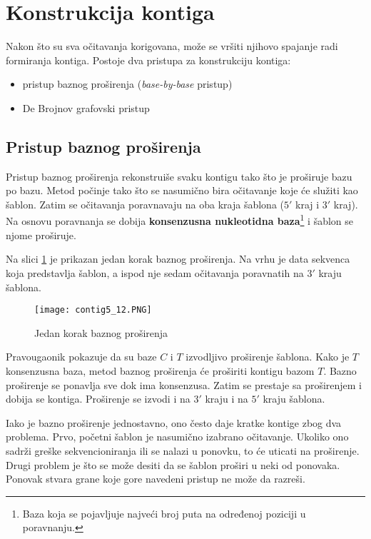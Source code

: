 \documentclass[12pt,oneside]{memoir}
\begin{document}
\section{Konstrukcija kontiga}
\label{poglavlje:KonstrukcijaKontiga}

Nakon što su sva očitavanja korigovana, može se vršiti njihovo spajanje radi formiranja kontiga. Postoje dva pristupa za konstrukciju kontiga:
\begin{itemize}
\itemsep0em 
    \item{pristup baznog proširenja (\textit{base-by-base} pristup)}
    \item{De Brojnov grafovski pristup}
\end{itemize}

\subsection{Pristup baznog proširenja}

Pristup baznog proširenja rekonstruiše svaku kontigu tako što je proširuje bazu po bazu. Metod počinje tako što se nasumično bira očitavanje koje će služiti kao šablon. Zatim se očitavanja poravnavaju na oba kraja šablona ($5'$ kraj i $3'$ kraj). Na osnovu poravnanja se dobija \textbf{konsenzusna nukleotidna baza}\footnote{Baza koja se pojavljuje najveći broj puta na određenoj poziciji u poravnanju.} i šablon se njome proširuje.

Na slici \ref{fig:7} je prikazan jedan korak baznog proširenja.
Na vrhu je data sekvenca koja predstavlja šablon, a ispod nje sedam očitavanja poravnatih na $3'$ kraju šablona.

\begin{figure}[!ht]
  \centering
  \texttt{[image: contig5\_12.PNG]}
\caption{Jedan korak baznog proširenja \cite{WingKinSung}}
\label{fig:7}
\end{figure}

\noindent Pravougaonik pokazuje da su baze $C$ i $T$ izvodljivo proširenje šablona. Kako je $T$ konsenzusna baza, metod baznog proširenja će proširiti kontigu bazom $T$. Bazno proširenje se ponavlja sve dok ima konsenzusa. Zatim se prestaje sa proširenjem i dobija se kontiga. Proširenje se izvodi i na $3'$ kraju i na $5'$ kraju šablona.

Iako je bazno proširenje jednostavno, ono često daje kratke kontige zbog dva problema. Prvo, početni šablon je nasumično izabrano očitavanje. Ukoliko ono sadrži greške sekvencioniranja ili se nalazi u ponovku, to će uticati na proširenje. Drugi problem je što se može desiti da se šablon proširi u neki od ponovaka. Ponovak stvara grane koje gore navedeni pristup ne može da razreši.
\end{document}
